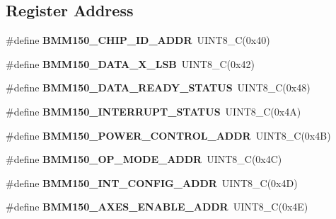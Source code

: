 \subsection*{Register Address}
\begin{DoxyCompactItemize}
\item 
\mbox{\label{group___b_m_m150_ga0c3d28ca135139ff161d04d4a62e97b1}} 
\#define {\bfseries B\+M\+M150\+\_\+\+C\+H\+I\+P\+\_\+\+I\+D\+\_\+\+A\+D\+DR}~U\+I\+N\+T8\+\_\+C(0x40)
\item 
\mbox{\label{group___b_m_m150_ga97183a59b8ef57948cd3c8553e84e2d6}} 
\#define {\bfseries B\+M\+M150\+\_\+\+D\+A\+T\+A\+\_\+\+X\+\_\+\+L\+SB}~U\+I\+N\+T8\+\_\+C(0x42)
\item 
\mbox{\label{group___b_m_m150_gac980d0255f3e86bebed102696b46dc41}} 
\#define {\bfseries B\+M\+M150\+\_\+\+D\+A\+T\+A\+\_\+\+R\+E\+A\+D\+Y\+\_\+\+S\+T\+A\+T\+US}~U\+I\+N\+T8\+\_\+C(0x48)
\item 
\mbox{\label{group___b_m_m150_ga4c316e2cf4b161c229b432e93ba69387}} 
\#define {\bfseries B\+M\+M150\+\_\+\+I\+N\+T\+E\+R\+R\+U\+P\+T\+\_\+\+S\+T\+A\+T\+US}~U\+I\+N\+T8\+\_\+C(0x4\+A)
\item 
\mbox{\label{group___b_m_m150_gaf5a0a241dbf7482c2d4981d464c04674}} 
\#define {\bfseries B\+M\+M150\+\_\+\+P\+O\+W\+E\+R\+\_\+\+C\+O\+N\+T\+R\+O\+L\+\_\+\+A\+D\+DR}~U\+I\+N\+T8\+\_\+C(0x4\+B)
\item 
\mbox{\label{group___b_m_m150_ga4aa63fdab9b4aebde8973bc159e3119e}} 
\#define {\bfseries B\+M\+M150\+\_\+\+O\+P\+\_\+\+M\+O\+D\+E\+\_\+\+A\+D\+DR}~U\+I\+N\+T8\+\_\+C(0x4\+C)
\item 
\mbox{\label{group___b_m_m150_ga9a3c738a8f096327529103205394eb3a}} 
\#define {\bfseries B\+M\+M150\+\_\+\+I\+N\+T\+\_\+\+C\+O\+N\+F\+I\+G\+\_\+\+A\+D\+DR}~U\+I\+N\+T8\+\_\+C(0x4\+D)
\item 
\mbox{\label{group___b_m_m150_ga89a8feee9832b4c066996a14538fa2de}} 
\#define {\bfseries B\+M\+M150\+\_\+\+A\+X\+E\+S\+\_\+\+E\+N\+A\+B\+L\+E\+\_\+\+A\+D\+DR}~U\+I\+N\+T8\+\_\+C(0x4\+E)
\item 

\end{DoxyCompactItemize}
